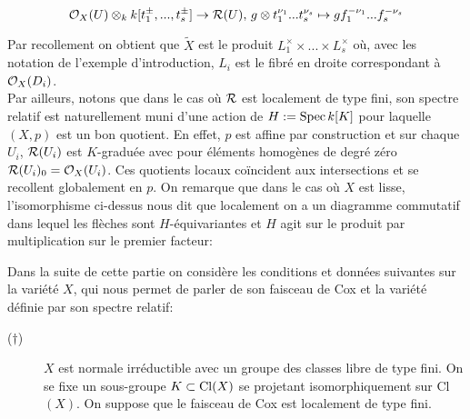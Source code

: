 $$\mathcal{O}_X(U)\otimes_k k[t_1^{\pm},...,t_s^{\pm}] \rightarrow \mathcal{R}(U),\, g\otimes t_1^{\nu_1}...t_s^{\nu_s}\mapsto gf_1^{-\nu_1}...f_s^{-\nu_s}$$

Par recollement on obtient que $\widetilde{X}$ est le produit $L_1^\times\times...\times L_s^\times$ où, avec les notation de l'exemple d'introduction, $L_i$ est le fibré en droite correspondant à $\mathcal{O}_X(D_i)$.\\
Par ailleurs, notons que dans le cas où $\mathcal{R}$ est localement de type fini, son spectre relatif est naturellement muni d'une action de $H:=\operatorname{Spec} k[K]$ pour laquelle $(X,p)$ est un bon quotient.  En effet, $p$ est affine par construction et sur chaque $U_i$, $\mathcal{R}(U_i)$ est $K$-graduée avec pour éléments homogènes de degré zéro $\mathcal{R}(U_i)_0=\mathcal{O}_X(U_i)$. Ces quotients locaux coïncident aux intersections et se recollent globalement en $p$. On remarque que dans le cas où $X$ est lisse, l'isomorphisme ci-dessus nous dit que localement on a un diagramme commutatif dans lequel les flèches sont $H$-équivariantes et $H$ agit sur le produit par multiplication sur le premier facteur:
\begin{center}
\end{center}

Dans la suite de cette partie on considère les conditions et données suivantes sur la variété $X$, qui nous permet de parler de son faisceau de Cox et la variété définie par son spectre relatif:

\begin{description}
\item [($\dagger$)] $X$ est normale irréductible avec un groupe des classes libre de type fini. On se fixe un sous-groupe $K\subset \operatorname{Cl}(X)$ se projetant isomorphiquement sur Cl$(X)$. On suppose que le faisceau de Cox est localement de type fini.
\end{description}

